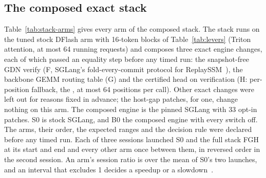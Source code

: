 \subsection{The composed exact stack}\label{app:stack-composition}
Table~\ref{tab:stack-arms} gives every arm of the composed stack. The stack runs on the tuned stock DFlash arm with 16-token blocks of Table~\ref{tab:levers} (Triton attention, at most 64 running requests) and composes three exact engine changes, each of which passed an equality step before any timed run: the snapshot-free GDN verify (F, SGLang's fold-every-commit protocol for ReplaySSM~\cite{gdncode}), the backbone GEMM routing table (G) and the certified head on verification (H: per-position fallback, the \modelcons, at most 64 positions per call). Other exact changes were left out for reasons fixed in advance; the host-gap patches, for one, change nothing on this arm. The composed engine is the pinned SGLang with 33 opt-in patches. S0 is stock SGLang, and B0 the composed engine with every switch off. The arms, their order, the expected ranges and the decision rule were declared before any timed run. Each of three sessions launched S0 and the full stack FGH at its start and end and every other arm once between them, in reversed order in the second session. An arm's session ratio is over the mean of S0's two launches, and an interval that excludes 1 decides a speedup or a slowdown~.


